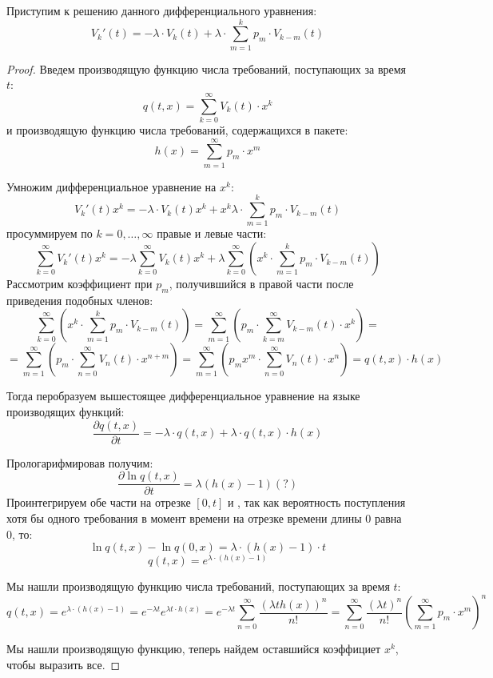 \documentclass[aps,%
12pt,%
final,%
oneside,
onecolumn,%
musixtex, %
superscriptaddress,%
centertags]{article} %
\theoremstyle{plain}
\theoremstyle{definition}
\theoremstyle{remark}
\begin{document}
Приступим к решению данного дифференциального уравнения:
$$V_k'(t) = -\lambda \cdot V_k(t) + \lambda \cdot \sum\limits_{m=1}^k p_m \cdot V_{k-m}(t)$$
\begin{proof}
	Введем производящую функцию числа требований, поступающих за время $t$:
	$$q(t,x) = \sum\limits_{k=0}^{\infty} V_k(t) \cdot x^k$$
	и производящую функцию числа требований, содержащихся в пакете:
	$$h(x) = \sum\limits_{m=1}^{\infty}p_m \cdot x^m$$

	Умножим дифференциальное уравнение на $x^k$:
	$$V_k'(t) x^k= -\lambda \cdot V_k(t) x^k + x^k \lambda \cdot \sum\limits_{m=1}^k p_m \cdot V_{k-m}(t)$$
	просуммируем по $k=0,\ldots,\infty$ правые и левые части:
	$$\sum\limits_{k=0}^{\infty}V_k'(t) x^k = -\lambda \sum\limits_{k=0}^{\infty}V_k(t) x^k +  \lambda\sum\limits_{k=0}^{\infty} \left(x^k \cdot \sum\limits_{m=1}^k p_m \cdot V_{k-m}(t) \right)$$
	Рассмотрим коэффициент при $p_m$, получившийся в правой части после приведения подобных членов:
	$$\sum\limits_{k=0}^{\infty} \left(x^k \cdot \sum\limits_{m=1}^k p_m \cdot V_{k-m}(t) \right) = \sum\limits_{m=1}^{\infty} \left(p_m \cdot \sum\limits_{k=m}^{\infty} V_{k-m}(t) \cdot  x^k \right) =$$
	$$ = \sum\limits_{m=1}^{\infty} \left(p_m \cdot \sum\limits_{n=0}^{\infty} V_{n}(t) \cdot  x^{n+m} \right)= \sum\limits_{m=1}^{\infty} \left(p_m x^m \cdot \sum\limits_{n=0}^{\infty} V_{n}(t) \cdot  x^n \right) = q(t,x) \cdot h(x)$$

	Тогда перобразуем вышестоящее дифференциальное уравнение на языке производящих функций:
	$$\frac{\partial q(t,x)}{\partial t} = -  \lambda \cdot q(t,x) + \lambda \cdot q(t,x) \cdot h(x)$$

	Прологарифмировав получим:
	$$\frac{\partial \ln q(t,x)}{\partial t} =\lambda(h(x)-1) (?)$$
	Проинтегрируем обе части на отрезке $[0,t]$ и , так как вероятность поступления хотя бы одного требования в момент времени на отрезке времени длины $0$ равна $0$, то:
	$$\ln q(t,x) - \ln q(0,x) = \lambda \cdot (h(x)-1) \cdot t$$
	$$q(t,x) = e^{ \lambda \cdot (h(x)-1)} $$

	Мы нашли производящую функцию числа требований, поступающих за время $t$:
	$$q(t,x) = e^{ \lambda \cdot (h(x)-1)}  = e^{-\lambda t}e^{\lambda t \cdot h(x)} = e^{-\lambda t} \sum\limits_{n=0}^{\infty}\frac{(\lambda t h(x))^n}{n!} =\sum\limits_{n=0}^{\infty}\frac{(\lambda t)^n}{n!} \left( \sum\limits_{m=1}^{\infty}p_m \cdot x^m\right)^n$$

	Мы нашли производящую функцию, теперь найдем оставшийся коэффициет $x^k$, чтобы выразить все.


\end{proof}
\end{document}
